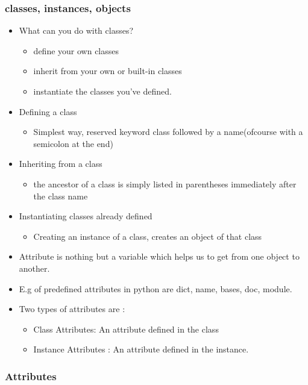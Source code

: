 \documentclass{beamer}
\begin{document}
\begin{frame}[fragile]

\frametitle{classes, instances, objects}
\begin{itemize}
\framesubtitle{}

\item What can you do with classes? 
		\begin{itemize}
		\item define your own classes 
\item inherit from your own or built-in classes 
\item instantiate the classes you've defined.
		\end{itemize}
	\item Defining a class
		\begin{itemize}
		\item Simplest way, reserved keyword class followed by a name(ofcourse with a semicolon at the end)
 		\end{itemize}
 	\item Inheriting from a class
 	\begin{itemize}
\item the ancestor of a class is simply listed in parentheses immediately after the class name 
\end{itemize}
\item Instantiating classes already defined
\begin{itemize}
\item Creating an instance of a class, creates an object of that class
\end{itemize}
\end{itemize}
\end{frame}

\begin{frame}[fragile]
\begin{itemize}
\item Attribute is nothing but a variable which helps us to get from one object to another.
\item E.g of predefined attributes in python are dict, name, bases, doc, module.
\item Two types of attributes are :
\begin{itemize}
\item Class Attributes: An attribute defined in the class
\item Instance Attributes : An attribute defined in the instance.
\end{itemize}
\end{itemize}
\frametitle{Attributes}
\framesubtitle{}

\end{frame}
\end{document}
